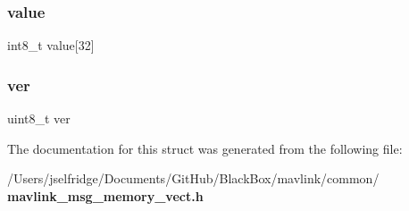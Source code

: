 \mbox{\label{struct____mavlink__memory__vect__t_ad1c3d9badd3a51cb17011d905b3003df}} 
\subsubsection{value}
{\footnotesize\ttfamily int8\+\_\+t value[32]}

\mbox{\label{struct____mavlink__memory__vect__t_ae106cd5a700482b11ccde5ee231f6350}} 
\subsubsection{ver}
{\footnotesize\ttfamily uint8\+\_\+t ver}



The documentation for this struct was generated from the following file\+:\begin{DoxyCompactItemize}
\item 
/\+Users/jselfridge/\+Documents/\+Git\+Hub/\+Black\+Box/mavlink/common/\textbf{ mavlink\+\_\+msg\+\_\+memory\+\_\+vect.\+h}\end{DoxyCompactItemize}
